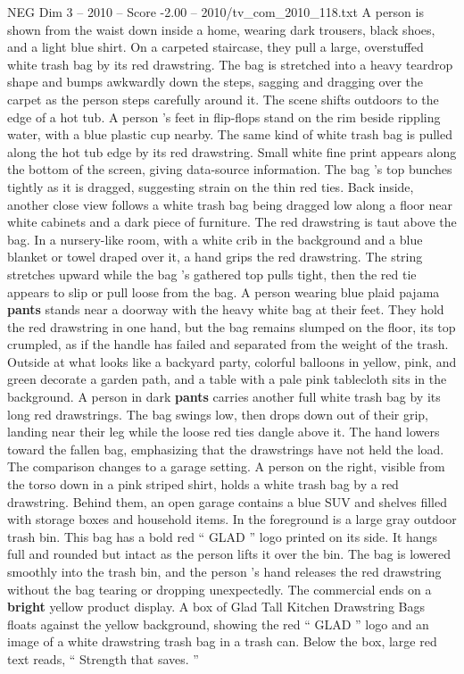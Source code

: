 \begin{textsample}{NEG Dim 3 – 2010 – Score -2.00 – 2010/tv\_com\_2010\_118.txt}  \label{ex:f3_neg_018}
A person is shown from the waist down inside a home, wearing dark trousers, black shoes, and a light blue shirt.
On a carpeted staircase, they pull a large, overstuffed white trash bag by its red drawstring.
The bag is stretched into a heavy teardrop shape and bumps awkwardly down the steps, sagging and dragging over the carpet as the person steps carefully around it.
The scene shifts outdoors to the edge of a hot tub.
A person ’s feet in flip-flops stand on the rim beside rippling water, with a blue plastic cup nearby.
The same kind of white trash bag is pulled along the hot tub edge by its red drawstring.
Small white fine print appears along the bottom of the screen, giving data-source information.
The bag ’s top bunches tightly as it is dragged, suggesting strain on the thin red ties.
Back inside, another close view follows a white trash bag being dragged low along a floor near white cabinets and a dark piece of furniture.
The red drawstring is taut above the bag.
In a nursery-like room, with a white crib in the background and a blue blanket or towel draped over it, a hand grips the red drawstring.
The string stretches upward while the bag ’s gathered top pulls tight, then the red tie appears to slip or pull loose from the bag.
A person wearing blue plaid pajama \textbf{pants} stands near a doorway with the heavy white bag at their feet.
They hold the red drawstring in one hand, but the bag remains slumped on the floor, its top crumpled, as if the handle has failed and separated from the weight of the trash.
Outside at what looks like a backyard party, colorful balloons in yellow, pink, and green decorate a garden path, and a table with a pale pink tablecloth sits in the background.
A person in dark \textbf{pants} carries another full white trash bag by its long red drawstrings.
The bag swings low, then drops down out of their grip, landing near their leg while the loose red ties dangle above it.
The hand lowers toward the fallen bag, emphasizing that the drawstrings have not held the load.
The comparison changes to a garage setting.
A person on the right, visible from the torso down in a pink striped shirt, holds a white trash bag by a red drawstring.
Behind them, an open garage contains a blue SUV and shelves filled with storage boxes and household items.
In the foreground is a large gray outdoor trash bin.
This bag has a bold red “ GLAD ” logo printed on its side.
It hangs full and rounded but intact as the person lifts it over the bin.
The bag is lowered smoothly into the trash bin, and the person ’s hand releases the red drawstring without the bag tearing or dropping unexpectedly.
The commercial ends on a \textbf{bright} yellow product display.
A box of Glad Tall Kitchen Drawstring Bags floats against the yellow background, showing the red “ GLAD ” logo and an image of a white drawstring trash bag in a trash can.
Below the box, large red text reads, “ Strength that saves. ”

\end{textsample}
